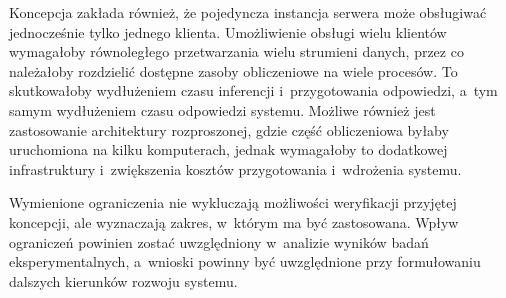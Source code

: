Koncepcja zakłada również, że pojedyncza instancja serwera może obsługiwać jednocześnie tylko jednego klienta. Umożliwienie obsługi wielu klientów wymagałoby równoległego przetwarzania wielu strumieni danych, przez co należałoby rozdzielić dostępne zasoby obliczeniowe na wiele procesów. To skutkowałoby wydłużeniem czasu inferencji i~przygotowania odpowiedzi, a~tym samym wydłużeniem czasu odpowiedzi systemu. Możliwe również jest zastosowanie architektury rozproszonej, gdzie część obliczeniowa byłaby uruchomiona na kilku komputerach, jednak wymagałoby to dodatkowej infrastruktury i~zwiększenia kosztów przygotowania i~wdrożenia systemu.

Wymienione ograniczenia nie wykluczają możliwości weryfikacji przyjętej koncepcji, ale wyznaczają zakres, w~którym ma być zastosowana. Wpływ ograniczeń powinien zostać uwzględniony w~analizie wyników badań eksperymentalnych, a~wnioski powinny być uwzględnione przy formułowaniu dalszych kierunków rozwoju systemu.
